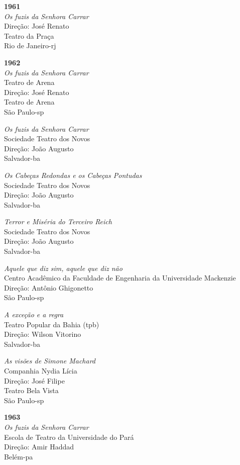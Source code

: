 {\item{\bf 1961}\\
{\it Os fuzis da Senhora Carrar}\\
Direção: José Renato\\
Teatro da Praça\\
Rio de Janeiro-{\sc rj}

\item{\bf 1962}\\
{\it Os fuzis da Senhora Carrar}\\
Teatro de Arena\\
Direção: José Renato\\
Teatro de Arena\\
São Paulo-{\sc sp}

{\it Os fuzis da Senhora Carrar}\\
Sociedade Teatro dos Novos\\
Direção: João Augusto\\
Salvador-{\sc ba}

{\it Os Cabeças Redondas e os Cabeças Pontudas}\\
Sociedade Teatro dos Novos\\
Direção: João Augusto\\
Salvador-{\sc ba}

{\it Terror e Miséria do Terceiro Reich}\\
Sociedade Teatro dos Novos\\
Direção: João Augusto\\
Salvador-{\sc ba}

{\it Aquele que diz sim, aquele que diz não}\\
Centro Acadêmico da Faculdade de Engenharia da Universidade Mackenzie\\
Direção: Antônio Ghigonetto\\
São Paulo-{\sc sp}

{\it A exceção e a regra}\\
Teatro Popular da Bahia ({\sc tpb})\\
Direção: Wilson Vitorino\\
Salvador-{\sc ba}

{\it As visões de Simone Machard}\\
Companhia Nydia Lícia\\
Direção: José Filipe\\
Teatro Bela Vista\\
São Paulo-{\sc sp}

\item{\bf 1963}\\
{\it Os fuzis da Senhora Carrar}\\
Escola de Teatro da Universidade do Pará\\
Direção: Amir Haddad\\
Belém-{\sc pa}

}

